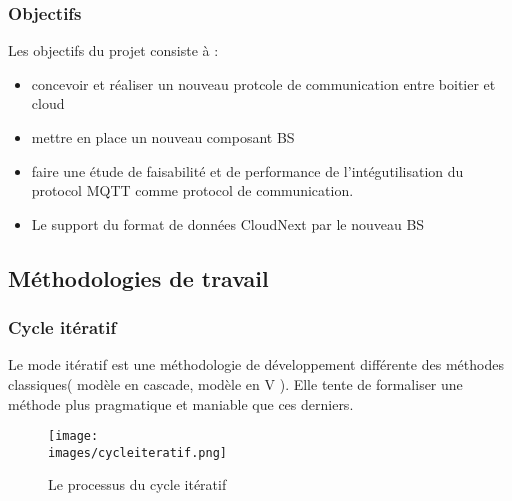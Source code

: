          \subsubsection{Objectifs}
            Les objectifs du projet consiste à : 
            \begin{itemize}
                \renewcommand{\labelitemi}{$\bullet$}
                \item concevoir et réaliser un nouveau protcole de communication entre boitier et cloud
                \item mettre en place un nouveau composant \gls{BS}
                \item faire une étude de faisabilité et de performance de l'intégutilisation du protocol MQTT 
                comme protocol de communication.
                \item Le support du format de données CloudNext par le nouveau BS
            \end{itemize} 

    \subsection{Méthodologies de travail}
        \subsubsection{Cycle itératif}
            Le mode itératif est une méthodologie de développement différente des méthodes classiques( modèle en cascade, modèle en V ).
            Elle tente de formaliser une méthode plus pragmatique et maniable que ces derniers. 
            \begin{figure}[ht]
                \centering
                \texttt{[image: \\images/cycleiteratif.png]}
                \caption{Le processus du cycle itératif}
            \end{figure}
           
            \vspace{0.2cm}

